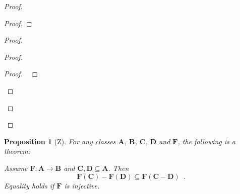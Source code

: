 \documentclass{book}
\let\qed\relax
\newtheorem{prop}[ax]{Proposition}
\theoremstyle{definition}
\begin{document}
\begin{proof}
\pf
{}
\begin{proof}
\end{proof}
\begin{proof}
	\begin{proof}
		\begin{proof}
			\pf\ 
		\end{proof}
	\end{proof}
\end{proof}
\qed
\end{proof}

\begin{prop}[Z]
\label{prop:imgdiff}
For any classes $\mathbf{A}$, $\mathbf{B}$, $\mathbf{C}$, $\mathbf{D}$ and $\mathbf{F}$, the following is a theorem:

Assume $\mathbf{F} : \mathbf{A} \rightarrow \mathbf{B}$ and $\mathbf{C}, \mathbf{D} \subseteq \mathbf{A}$. Then
\[ \mathbf{F}(\mathbf{C}) - \mathbf{F}(\mathbf{D}) \subseteq \mathbf{F}(\mathbf{C} - \mathbf{D}) \enspace . \]
Equality holds if $\mathbf{F}$ is injective.
\end{prop}
\end{document}
